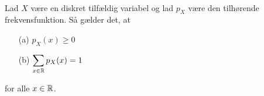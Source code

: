 \begin{minipage}\textwidth
\begin{pro}\label{prop:frekvensfunktion}\textbf{}\\
    Lad $X$ være en diskret tilfældig variabel og lad $p_X$ være den tilhørende frekvensfunktion. Så gælder det, at
    \begin{enumerate}
        \item[(a)] $\displaystyle p_X(x)\geq 0$
        \item[(b)] $\displaystyle \sum_{x\in \mathbb{R}} p_X(x)=1$
    \end{enumerate}
    for alle $x\in \mathbb{R}$.
\end{pro}
\end{minipage}

